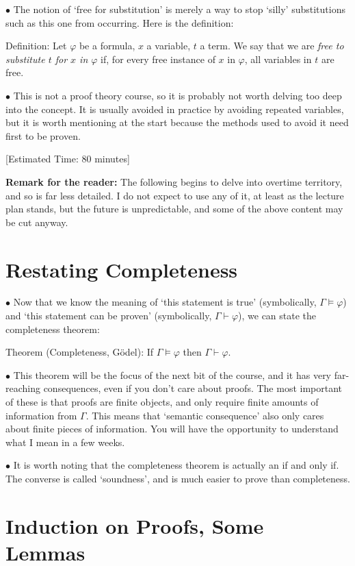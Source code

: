 \documentclass{article}
\newcommand\point[1]{\noindent \hspace{\labelsep} $\bullet$ #1 \smallskip}
\newcommand\timestamp[1]{\noindent \hspace{\labelsep} [Estimated Time: #1] \smallskip}
\begin{document}
\point{The notion of `free for substitution' is merely a way to stop `silly' substitutions such as this one from occurring. Here is the definition:

Definition: Let $\varphi$ be a formula, $x$ a variable, $t$ a term. We say that we are \emph{free to substitute $t$ for $x$ in $\varphi$} if, for every free instance of $x$ in $\varphi$, all variables in $t$ are free.}

\point{This is not a proof theory course, so it is probably not worth delving too deep into the concept. It is usually avoided in practice by avoiding repeated variables, but it is worth mentioning at the start because the methods used to avoid it need first to be proven.}

\timestamp{80 minutes}

\medskip

\textbf{Remark for the reader:} The following begins to delve into overtime territory, and so is far less detailed. I do not expect to use any of it, at least as the lecture plan stands, but the future is unpredictable, and some of the above content may be cut anyway.

\section{Restating Completeness}

\point{Now that we know the meaning of `this statement is true' (symbolically, $\Gamma \vDash \varphi$) and `this statement can be proven' (symbolically, $\Gamma \vdash \varphi$), we can state the completeness theorem:

Theorem (Completeness, Gödel): If $\Gamma \vDash \varphi$ then $\Gamma \vdash \varphi$.}

\point{This theorem will be the focus of the next bit of the course, and it has very far-reaching consequences, even if you don't care about proofs. The most important of these is that proofs are finite objects, and only require finite amounts of information from $\Gamma$. This means that `semantic consequence' also only cares about finite pieces of information. You will have the opportunity to understand what I mean in a few weeks.}

\point{It is worth noting that the completeness theorem is actually an if and only if. The converse is called `soundness', and is much easier to prove than completeness.}

\section{Induction on Proofs, Some Lemmas}
\end{document}
